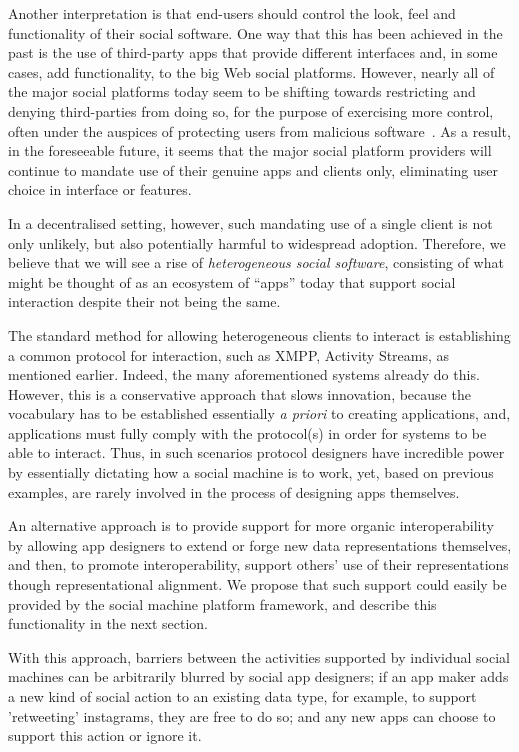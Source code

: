 \documentclass{sig-alternate}
\begin{document}
Another interpretation is that end-users should control the look, feel and functionality of their social software.  One way that this has been achieved in the past is the use of third-party apps that provide different interfaces and, in some cases, add functionality, to the big Web social platforms. However, nearly all of the major social platforms today seem to be shifting towards restricting and denying third-parties from doing so, for the purpose of exercising more control, often under the auspices of protecting users from malicious software~\cite{shutdown}. As a result, in the foreseeable future, it seems that the major social platform providers will continue to mandate use of their genuine apps and clients only, eliminating user choice in interface or features.

In a decentralised setting, however, such mandating use of a single client is not only unlikely, but also potentially harmful to widespread adoption.  Therefore, we believe that we will see a rise of \emph{heterogeneous social software}, consisting of what might be thought of as an ecosystem of ``apps'' today that support social interaction despite their not being the same. 

The standard method for allowing heterogeneous clients to interact is establishing a common protocol for interaction, such as XMPP, Activity Streams, as mentioned earlier. Indeed, the many aforementioned systems already do this. However, this is a conservative approach that slows innovation, because the vocabulary has to be established essentially \emph{a priori} to creating applications, and, applications must fully comply with the protocol(s) in order for systems to be able to interact.  Thus, in such scenarios protocol designers have incredible power by essentially dictating how a social machine is to work, yet, based on previous examples, are rarely involved in the process of designing apps themselves.

An alternative approach is to provide support for more organic interoperability by allowing app designers to extend or forge new data representations themselves, and then, to promote interoperability, support others' use of their representations though representational alignment. We propose that such support could easily be provided by the social machine platform framework, and describe this functionality in the next section.  

With this approach, barriers between the activities supported by individual social machines can be arbitrarily blurred by social app designers; if an app maker adds a new kind of social action to an existing data type, for example, to support 'retweeting' instagrams, they are free to do so; and any new apps can choose to support this action or ignore it.
\end{document}
